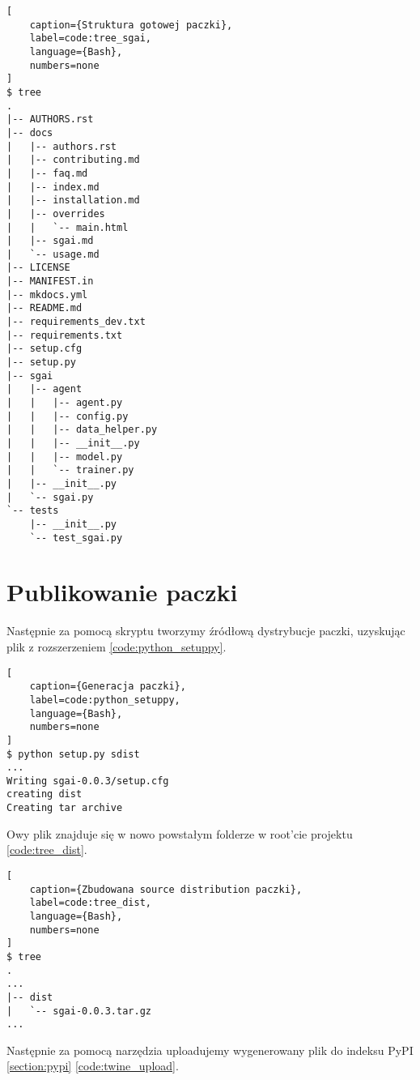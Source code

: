 \begin{onepage}
    \begin{lstlisting}[
    caption={Struktura gotowej paczki},
    label=code:tree_sgai,
    language={Bash},
    numbers=none
]
$ tree
.
|-- AUTHORS.rst
|-- docs
|   |-- authors.rst
|   |-- contributing.md
|   |-- faq.md
|   |-- index.md
|   |-- installation.md
|   |-- overrides
|   |   `-- main.html
|   |-- sgai.md
|   `-- usage.md
|-- LICENSE
|-- MANIFEST.in
|-- mkdocs.yml
|-- README.md
|-- requirements_dev.txt
|-- requirements.txt
|-- setup.cfg
|-- setup.py
|-- sgai
|   |-- agent
|   |   |-- agent.py
|   |   |-- config.py
|   |   |-- data_helper.py
|   |   |-- __init__.py
|   |   |-- model.py
|   |   `-- trainer.py
|   |-- __init__.py
|   `-- sgai.py
`-- tests
    |-- __init__.py
    `-- test_sgai.py
    \end{lstlisting}
\end{onepage}


\clearpage

\section{Publikowanie paczki}


Następnie za pomocą skryptu  tworzymy źródłową dystrybucje paczki, uzyskując plik z rozszerzeniem  \ref{code:python_setuppy}.

\begin{onepage}
    \begin{lstlisting}[
    caption={Generacja paczki},
    label=code:python_setuppy,
    language={Bash},
    numbers=none
]
$ python setup.py sdist
...
Writing sgai-0.0.3/setup.cfg
creating dist
Creating tar archive
    \end{lstlisting}
\end{onepage}


Owy plik znajduje się w nowo powstałym folderze  w root'cie projektu \ref{code:tree_dist}.

\begin{onepage}
    \begin{lstlisting}[
    caption={Zbudowana source distribution paczki},
    label=code:tree_dist,
    language={Bash},
    numbers=none
]
$ tree
.
...
|-- dist
|   `-- sgai-0.0.3.tar.gz
...
    \end{lstlisting}
\end{onepage}


Następnie za pomocą narzędzia  uploadujemy wygenerowany plik do indeksu PyPI \ref{section:pypi} \ref{code:twine_upload}.

